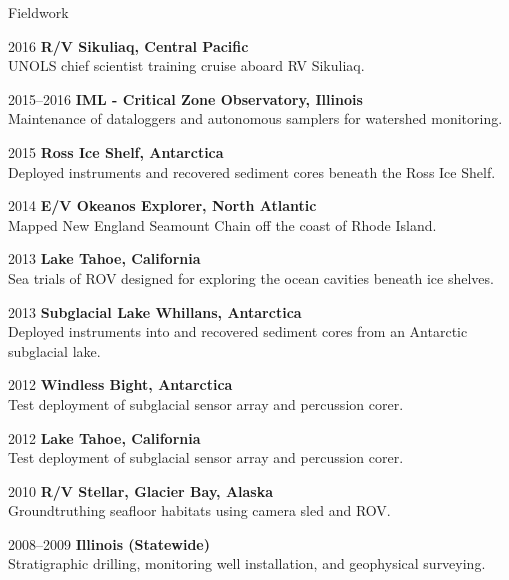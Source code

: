 \begin{cvlist}{Fieldwork} 

\item[2016] \textbf{R/V Sikuliaq, Central Pacific}\\
    UNOLS chief scientist training cruise aboard RV Sikuliaq.

\item[2015--2016] \textbf{IML - Critical Zone Observatory, Illinois}\\
    Maintenance of dataloggers and autonomous samplers for watershed monitoring.

\item[2015] \textbf{Ross Ice Shelf, Antarctica}\\
    Deployed instruments and recovered sediment cores beneath the Ross Ice Shelf.

\item[2014] \textbf{E/V Okeanos Explorer, North Atlantic}\\
    Mapped New England Seamount Chain off the coast of Rhode Island.

\item[2013] \textbf{Lake Tahoe, California} \\
    Sea trials of ROV designed for exploring the ocean cavities beneath ice shelves.

\item[2013] \textbf{Subglacial Lake Whillans, Antarctica} \\
    Deployed instruments into and recovered sediment cores from an Antarctic subglacial lake.

\item[2012] \textbf{Windless Bight, Antarctica} \\
    Test deployment of subglacial sensor array and percussion corer.

\item[2012] \textbf{Lake Tahoe, California}\\
    Test deployment of subglacial sensor array and percussion corer.

\item[2010] \textbf{R/V Stellar, Glacier Bay, Alaska}\\
    Groundtruthing seafloor habitats using camera sled and ROV.

\item[2008--2009] \textbf{Illinois (Statewide)}\\
    Stratigraphic drilling, monitoring well installation, and geophysical surveying. 

\end{cvlist}
